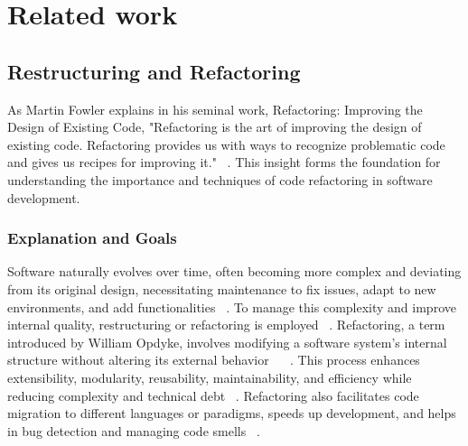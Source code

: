 
%

\chapter{Related work}
\label{cha:Related work}
  

\section{Restructuring and Refactoring}

As Martin Fowler explains in his seminal work, Refactoring: Improving the Design of Existing Code, "Refactoring is the art of improving the design of existing code. Refactoring provides us with ways to recognize problematic code and gives us recipes for improving it." ~\cite{RefactoringFowler2002Improving}. This insight forms the foundation for understanding the importance and techniques of code refactoring in software development.

\subsection{Explanation and Goals}

Software naturally evolves over time, often becoming more complex and deviating from its original design, necessitating maintenance to fix issues, adapt to new environments, and add functionalities ~\cite{RefactoringFowler2002Improving}. To manage this complexity and improve internal quality, restructuring or refactoring is employed ~\cite{30yearsSoftwareRefactoring2020}. Refactoring, a term introduced by William Opdyke, involves modifying a software system's internal structure without altering its external behavior ~\cite{SurveyRefactoring2004} ~\cite{articleOpdyke}. This process enhances extensibility, modularity, reusability, maintainability, and efficiency while reducing complexity and technical debt ~\cite{RefactoringFowler2002Improving}. Refactoring also facilitates code migration to different languages or paradigms, speeds up development, and helps in bug detection and managing code smells ~\cite{wake2004refactoringWorkbook}.

